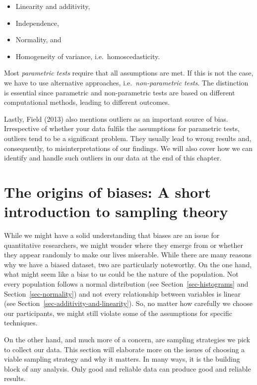 \documentclass[
  letterpaper,
  DIV=11,
  numbers=noendperiod]{scrreprt}
\begin{document}
\begin{itemize}
\item
  Linearity and additivity,
\item
  Independence,
\item
  Normality, and
\item
  Homogeneity of variance, i.e.~homoscedasticity.
\end{itemize}

Most \emph{parametric tests} require that all assumptions are met. If
this is not the case, we have to use alternative approaches,
i.e.~\emph{non-parametric tests}. The distinction is essential since
parametric and non-parametric tests are based on different computational
methods, leading to different outcomes.

Lastly, Field (2013) also mentions outliers as an important source of
bias. Irrespective of whether your data fulfils the assumptions for
parametric tests, outliers tend to be a significant problem. They
usually lead to wrong results and, consequently, to misinterpretations
of our findings. We will also cover how we can identify and handle such
outliers in our data at the end of this chapter.

\section{The origins of biases: A short introduction to sampling
theory}\label{origins-of-bias}

While we might have a solid understanding that biases are an issue for
quantitative researchers, we might wonder where they emerge from or
whether they appear randomly to make our lives miserable. While there
are many reasons why we have a biased dataset, two are particularly
noteworthy. On the one hand, what might seem like a bias to us could be
the nature of the population. Not every population follows a normal
distribution (see Section~\ref{sec-histograms} and
Section~\ref{sec-normality}) and not every relationship between
variables is linear (see Section~\ref{sec-additivity-and-linearity}).
So, no matter how carefully we choose our participants, we might still
violate some of the assumptions for specific techniques.

On the other hand, and much more of a concern, are sampling strategies
we pick to collect our data. This section will elaborate more on the
issues of choosing a viable sampling strategy and why it matters. In
many ways, it is the building block of any analysis. Only good and
reliable data can produce good and reliable results.
\end{document}
